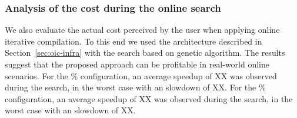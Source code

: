 \subsubsection{Analysis of the cost during the online search}

We also evaluate the actual cost perceived by the user when applying online iterative compilation.
To this end we used the architecture described in Section~\ref{sec:oic-infra} with the search based on genetic algorithm.
The results suggest that the proposed approach can be profitable in real-world online scenarios.
For the \% configuration, an average speedup of XX was observed during the search, in the worst case with an slowdown of XX.
For the \% configuration, an average speedup of XX was observed during the search, in the worst case with an slowdown of XX.

